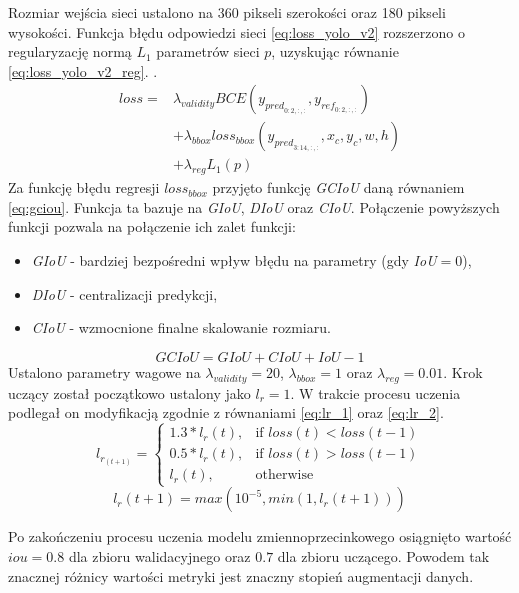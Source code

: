 Rozmiar wejścia sieci ustalono na 360 pikseli szerokości oraz 180 pikseli wysokości.
Funkcja błędu odpowiedzi sieci \eqref{eq:loss_yolo_v2} rozszerzono o regularyzację normą $L_1$ parametrów sieci $p$, uzyskując równanie \eqref{eq:loss_yolo_v2_reg}. .
\begin{equation}
\begin{aligned}
loss =& \lambda_{validity} BCE(y_{pred}_{0:2,:,:}, y_{ref}_{0:2,:,:}) \\
&+ \lambda_{bbox} loss_{bbox}(y_{pred}_{3:14,:,:}, x_c,y_c,w,h)\\
&+ \lambda_{reg} L_1(p)
\end{aligned}
\label{eq:loss_yolo_v2_reg}
\end{equation}
Za funkcję błędu regresji $loss_{bbox}$  przyjęto funkcję \emph{GCIoU} daną równaniem \eqref{eq:gciou}. 
Funkcja ta bazuje na \emph{GIoU}\cite{giou}, \emph{DIoU}\cite{dciou} oraz \emph{CIoU}\cite{dciou}. 
Połączenie powyższych funkcji pozwala na połączenie ich zalet funkcji: 
\begin{itemize}
    \item \emph{GIoU} - bardziej bezpośredni wpływ błędu na parametry (gdy \emph{IoU}$ = 0$),
    \item \emph{DIoU} - centralizacji predykcji,
    \item \emph{CIoU} - wzmocnione finalne skalowanie rozmiaru. 
\end{itemize}
\begin{equation}
GCIoU = GIoU + CIoU + IoU - 1
\label{eq:gciou}
\end{equation}
Ustalono parametry wagowe na $\lambda_{validity} = 20$, $\lambda_{bbox} = 1$ oraz $\lambda_{reg} = 0.01$.
Krok uczący został początkowo ustalony jako $l_r=1$. 
W trakcie procesu uczenia podlegał on modyfikacją zgodnie z równaniami \eqref{eq:lr_1} oraz \eqref{eq:lr_2}.
\begin{equation}
l_r_(t+1) = 
\begin{cases}
    1.3*l_r(t), &\text{if } loss(t) < loss(t-1) \\
    0.5*l_r(t), &\text{if } loss(t) > loss(t-1) \\
    l_r(t), &\text{otherwise}
\end{cases}
\label{eq:lr_1}
\end{equation}
\begin{equation}
l_r(t+1) = max(10^{-5}, min(1, l_r(t+1)))
\label{eq:lr_2}
\end{equation}


Po zakończeniu procesu uczenia modelu zmiennoprzecinkowego osiągnięto wartość $iou = 0.8$ dla zbioru walidacyjnego oraz $0.7$ dla zbioru uczącego. 
Powodem tak znacznej różnicy wartości metryki jest znaczny stopień augmentacji danych.

